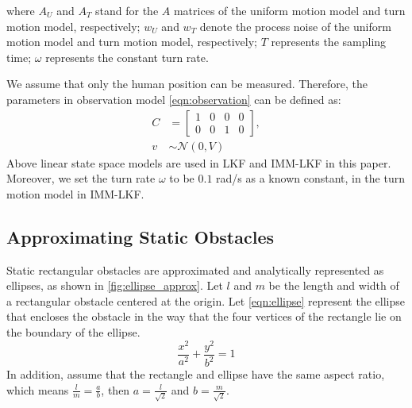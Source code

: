 \documentclass[letterpaper, 10 pt, conference]{ieeeconf}
\begin{document}
	where $A_U$ and $A_T$ stand for the $A$ matrices of the uniform motion model and turn motion model, respectively; $w_U$ and $w_T$ denote the process noise of the uniform motion model and turn motion model, respectively; $T$ represents the sampling time; $\omega$ represents the constant turn rate.
	
	We assume that only the human position can be measured.
	Therefore, the parameters in observation model \cref{eqn:observation} can be defined as:
	\begin{subequations}
		\begin{align*}
			C&=\left[
			\begin{array}{cccc}
				1& 0& 0& 0\\
				0& 0& 1& 0
			\end{array}\right],\\
			v&\sim\mathcal{N}(0,V)
		\end{align*}
	\end{subequations}
	Above linear state space models are used in LKF and IMM-LKF in this paper.
	Moreover, we set the turn rate $\omega$ to be $0.1$ rad/s as a known constant, in the turn motion model in IMM-LKF. 
	
	\subsection{Approximating Static Obstacles}
	Static rectangular obstacles are approximated and analytically represented as ellipses, as shown in \cref{fig:ellipse_approx}.
	Let $l$ and $m$ be the length and width of a rectangular obstacle centered at the origin.
	Let \cref{eqn:ellipse} represent the ellipse that encloses the obstacle in the way that the four vertices of the rectangle lie on the boundary of the ellipse.
	\begin{equation*}\label{eqn:ellipse}
		\frac{x^2}{a^2}+\frac{y^2}{b^2}=1
	\end{equation*}
	In addition, assume that the rectangle and ellipse have the same aspect ratio, which means $\frac{l}{m}=\frac{a}{b}$, then $a=\frac{l}{\sqrt{2}}$ and $b=\frac{m}{\sqrt{2}}$.
	
	
	
	\addtolength{\textheight}{-12cm}   %
	
	
	
	
	
\end{document}
